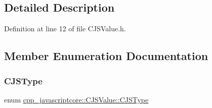 \subsection{Detailed Description}


Definition at line 12 of file C\+J\+S\+Value.\+h.



\subsection{Member Enumeration Documentation}
\mbox{\label{classcpp__javascriptcore_1_1_c_j_s_value_a72505affa6537ee81f1d447fab22a890}} 
\subsubsection{\texorpdfstring{C\+J\+S\+Type}{CJSType}}
{\footnotesize\ttfamily enum \mbox{\hyperlink{classcpp__javascriptcore_1_1_c_j_s_value_a72505affa6537ee81f1d447fab22a890}{cpp\+\_\+javascriptcore\+::\+C\+J\+S\+Value\+::\+C\+J\+S\+Type}}\hspace{0.3cm}{\ttfamily [strong]}}

